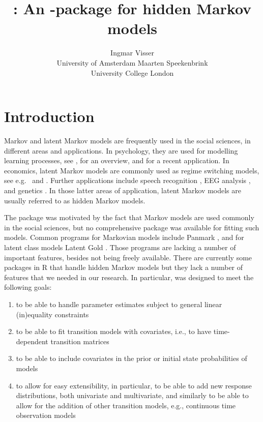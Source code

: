 \documentclass[article]{jss}
\author{Ingmar Visser\\University of Amsterdam \And 
        Maarten Speekenbrink\\University College London }
\title{\pkg{depmixS4}: An \proglang{R}-package for hidden Markov models}
\begin{document}

\section[]{Introduction}

Markov and latent Markov models are frequently used in the social
sciences, in different areas and applications.  In psychology, they
are used for modelling learning processes, see \citet{Wickens1982},
for an overview, and \citet{Schmittmann2006} for a recent application.
In economics, latent Markov models are commonly used as regime
switching models, see e.g.\ \citet{Kim1994} and \citet{Ghysels1994}.
Further applications include speech recognition \citep{Rabiner1989},
EEG analysis \citep{Rainer2000}, and genetics \citep{Krogh1998}.  In
those latter areas of application, latent Markov models are usually
referred to as hidden Markov models.

The  package was motivated by the fact that Markov models
are used commonly in the social sciences, but no comprehensive package
was available for fitting such models.  Common programs for Markovian
models include Panmark \citep{Pol1996}, and for latent class models
Latent Gold \citep{Vermunt2003}.  Those programs are lacking a number
of important features, besides not being freely available.  There are
currently some packages in R that handle hidden Markov models but they
lack a number of features that we needed in our research.  In
particular,  was designed to meet the following goals: 
\begin{enumerate}
	
	\item to be able to handle parameter estimates subject to general
	linear (in)equality constraints
	
	\item to be able to fit transition models with covariates, i.e.,
	to have time-dependent transition matrices
	
	\item to be able to include covariates in the prior or initial
	state probabilities of models
	
	\item to allow for easy extensibility, in particular, to be able
	to add new response distributions, both univariate and
	multivariate, and similarly to be able to allow for the addition
	of other transition models, e.g., continuous time observation
	models
	
\end{enumerate}
\end{document}
